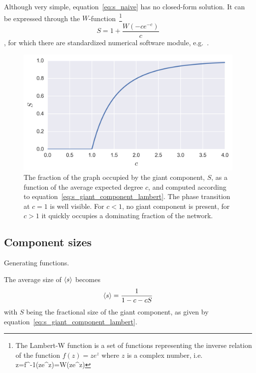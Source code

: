 \noindent Although very simple, equation~\ref{eq:s_naive} has no closed-form solution.
It can be expressed through the \Lambert $W$-function~\footnote{The Lambert-W function is a set of functions representing the inverse relation of the function $f(z) = z e^{z}$ where $z$ is a complex number, i.e. {\displaystyle\, z=f^{-1}(ze^{z})=W(ze^{z})}}
\begin{equation}
S = 1 + \frac{W(-c e^{-c})}{c}
\label{eq:s_giant_component_lambert}
\end{equation}
\noindent, for which there are standardized numerical software module, e.g.~\cite{sympy}.

\begin{figure}[tb]
	\centering
	\includegraphics[]{figures/2_s_as_function_of_c.png}
	\caption{The fraction of the graph occupied by the giant component, $S$, as a function of the average expected degree $c$, and computed according to equation~\ref{eq:s_giant_component_lambert}. The phase transition at $c=1$ is well visible. For $c < 1$, no giant component is present, for $c>1$ it quickly occupies a dominating fraction of the network.}
	\label{fig:s_as_function_of_c}
\end{figure}









\subsection{Component sizes} %
\label{sub:component_sizes}


Generating functions.

The average size of $\left< s \right>$ becomes 
\begin{equation}
	\left< s \right> = \frac{1}{1-c-cS}
\end{equation}
with $S$ being the fractional size of the giant component, as given by equation~\ref{eq:s_giant_component_lambert}.

